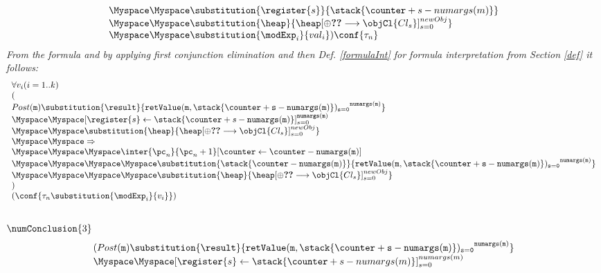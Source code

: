 \begin{enumerate}
\begin{enumerate}
$$\begin{array}{l}
                \Myspace \Myspace \substitution{\register{s}}{\stack{\counter + s - numargs(m)}}    \\
		\Myspace \Myspace  \substitution{\heap}{\heap[\oplus \Ref{Cl_s} \longrightarrow \objCl{Cl_s }]_{s=0}^{newObj} }	 \\
		\Myspace \Myspace \substitution{\modExp_i }{val_i} ) \conf{\state{n} }  
		\end{array}
		$$
		\textit{ From the formula  and by applying first conjunction elimination and then Def. \ref{formulaInt} for formula interpretation from Section \ref{def} it follows: } \\
		 
		$$   \begin{array}{l} 
				\forall  v_i ( i =1 .. k  )\\
(  \\ 
	 			Post( \texttt{m} )\substitution{\result}{\tt{retValue(m,\stack{\counter + s - \tt{numargs(m) }})_{s=0} }^{numargs(m) } }\\
	 				 	\Myspace \Myspace [ \register{s} \leftarrow \stack{\counter + s - \tt{numargs(m)}}]_{s = 0}^{\tt{numargs(m)} } \\	 				 				\Myspace \Myspace \substitution{\heap}{\heap[\oplus \Ref{Cl_s} \longrightarrow \objCl{Cl_s }]_{s=0}^{newObj} } \\	
						\Myspace \Myspace \Rightarrow \\  
	 				 	\Myspace \Myspace \Myspace  \inter{\pc_n}{\pc_n + 1 }[\counter \leftarrow \counter -  \tt{numargs(m)}   ] \\ 
						\Myspace \Myspace \Myspace \Myspace  \substitution{\stack{\counter - \tt{ numargs(m)}   }}{  \tt{retValue(m,\stack{\counter + s - numargs(m) })_{s=0} }^{numargs(m) }  }	\\
				\Myspace \Myspace \Myspace \Myspace \substitution{\heap}{\heap[\oplus \Ref{Cl_s} \longrightarrow \objCl{Cl_s }]_{s=0}^{newObj} } \\
) \\
			(\conf{\state{n} \substitution{\modExp_i  }{v_i} })
			\end{array}
		$$
		 \\
		$\numConclusion{3}  $ 
		$$\begin{array}{l}
			(
			Post( \texttt{m} )\substitution{\result}{\tt{retValue(m,\stack{\counter + s - numargs(m) })_{s=0} }^{numargs(m) } }\\
	 				 	\Myspace \Myspace [ \register{s} \leftarrow \stack{\counter + s - numargs(m)}]_{s = 0}^{numargs(m) } \\	

\end{array}$$
\end{enumerate}
\end{enumerate}
